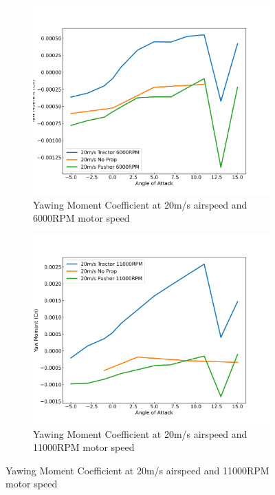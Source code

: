 \begin{figure}[H]
\begin{subfigure}[b]{0.467\textwidth}
        \label{fig:Cn_10ms_11000}
    \end{subfigure}
    \begin{subfigure}[b]{0.467\textwidth}
        \centering
        \includegraphics[width=\textwidth]{05_Results/Figs/Cn/20ms_6000RPM_Cn.png}
        \caption{Yawing Moment Coefficient at 20m/s airspeed and 6000RPM motor speed}
        \label{fig:Cn_20ms_6000}
    \end{subfigure}
    \begin{subfigure}[b]{0.467\textwidth}
        \centering
        \includegraphics[width=\textwidth]{05_Results/Figs/Cn/20ms_11000RPM_Cn.png}
        \caption{Yawing Moment Coefficient at 20m/s airspeed and 11000RPM motor speed}
        \label{fig:Cn_20ms_11000}
    \end{subfigure}
\end{figure}




